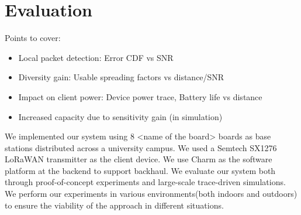 \section{Evaluation}
\label{sec:eval}

{\color{blue} Points to cover:

\begin{itemize}
    \item Local packet detection: Error CDF vs SNR
    \item Diversity gain: Usable spreading factors vs distance/SNR
    \item Impact on client power: Device power trace, Battery life vs distance
    \item Increased capacity due to sensitivity gain (in simulation)
\end{itemize}
}

We implemented our system using 8 <name of the board> boards as base stations distributed across a university campus.  We used a Semtech SX1276 LoRaWAN transmitter as the client device. We use Charm as the software platform at the backend to support backhaul. We evaluate our system both through proof-of-concept experiments and large-scale trace-driven simulations. We perform our experiments in various environments(both indoors and outdoors) to ensure the viability of the approach in different situations.
